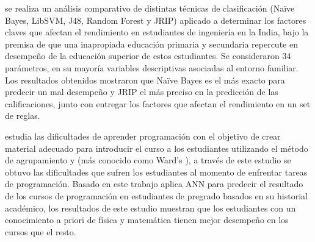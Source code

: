 \textcite{shamsi2016comparative} se realiza un análisis comparativo de distintas técnicas de clasificación (Na\"ive Bayes, LibSVM, J48, Random Forest y JRIP) aplicado a determinar los factores claves que afectan el rendimiento en estudiantes de ingeniería en la India, bajo la premisa de que una inapropiada educación primaria y secundaria repercute en desempeño de la educación superior de estos estudiantes. Se consideraron 34 parámetros, en su mayoría variables descriptivas asociadas al entorno familiar. Los resultados obtenidos mostraron que Na\"ive Bayes es el más exacto para predecir un mal desempeño y JRIP el más preciso en la predicción de las calificaciones, junto con entregar los factores que afectan el rendimiento en un set de reglas.






\textcite{lahtinen2005study} estudia las dificultades de aprender programación con el objetivo de crear material adecuado para introducir el curso a los estudiantes utilizando el método de agrupamiento  y  (más conocido como Ward's ), a través de este estudio se obtuvo las dificultades que sufren los estudiantes al momento de enfrentar tareas de programación. Basado en este trabajo \textcite{akinola2012data} aplica ANN para predecir el resultado de los cursos de programación en estudiantes de pregrado basados en su historial académico, los resultados de este estudio muestran que los estudiantes con un conocimiento a priori de física y matemática tienen mejor desempeño en los cursos que el resto.

